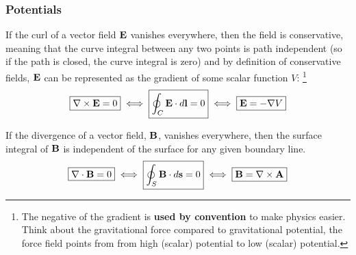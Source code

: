     \subsubsection*{Potentials}
        If the curl of a vector field $\vb{E}$ vanishes everywhere, then the field is conservative, meaning that the curve integral between any two points is path independent (so if the path is closed, the curve integral is zero) and by definition of conservative fields, $\vb{E}$ can be represented as the gradient of some scalar function $V$:
        \footnote{The negative of the gradient is \textbf{used by convention} to make physics easier. Think about the gravitational force compared to gravitational potential, the force field points from from high (scalar) potential to low (scalar) potential.}
        \begin{align*}
            \boxed{\nabla \times \vb{E} = 0} 
            \iff
            \boxed{\oint_C \vb{E}\cdot d\vb{l}=0} 
            \iff
            \boxed{\vb{E} = -\nabla V}
        \end{align*}

        If the divergence of a vector field, $\vb{B}$, vanishes everywhere, then the surface integral of $\vb{B}$ is independent of the surface for any given boundary line. 
        \begin{align*}
            \boxed{\nabla \cdot \vb{B} = 0} 
            \iff
            \boxed{\oint_S\vb{B}\cdot d\vb{s}=0}
            \iff
            \boxed{\vb{B} = \nabla \times \vb{A}}
        \end{align*}
        
%